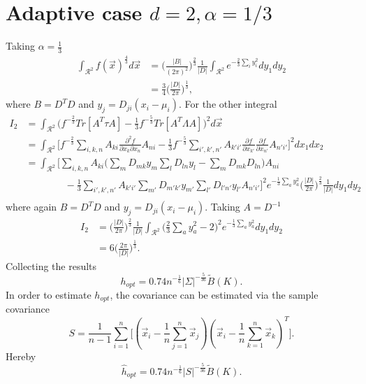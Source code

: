 \section{Adaptive case $d=2,\alpha=1/3$}
Taking $\alpha=\frac{1}{3}$
\begin{equation}
	\begin{split}
		\int_{\mathcal{R}^2}f(\vec{x})^{\frac{4}{3}}d\vec{x}&=\bigg(\frac{|B|}{(2\pi)^2}\bigg)^\frac{2}{3}\frac{1}{|D|}\int_{\mathcal{R}^2}e^{-\frac{2}{3}\sum_iy_i^2}dy_1dy_2\\
		&=\frac{3}{4}\bigg(\frac{|D|}{2\pi}\bigg)^\frac{1}{3},
	\end{split}
\end{equation}
where $B=D^TD$ and $y_j=D_{ji}(x_i-\mu_i)$. For the other integral
\begin{equation}
	\begin{split}
		I_2&=\int_{\mathcal{R}^2} \big(f^{-\frac{2}{3}}Tr[A^T\tau A]-\frac{1}{3}f^{-\frac{5}{3}}Tr[A^T\Lambda A]\big)^2d\vec{x}\\
		&=\int_{\mathcal{R}^2}\bigg[f^{-\frac{2}{3}}\sum_{i,k,n}A_{ki}\frac{\partial^2 f}{\partial x_k\partial x_n}A_{ni}-\frac{1}{3}f^{-\frac{5}{3}}\sum_{i',k',n'}A_{k'i'}\frac{\partial f}{\partial x_{k'}}\frac{\partial f}{\partial x_{n'}}A_{n'i'}\bigg]^2dx_1dx_2\\
		&=\int_{\mathcal{R}^2}\bigg[\sum_{i,k,n}A_{ki}\bigg(\sum_mD_{mk}y_m\sum_lD_{ln}y_l-\sum_{m}D_{mk}D_{ln}\bigg)A_{ni}\\
		&\qquad \qquad-\frac{1}{3}\sum_{i',k',n'}A_{k'i'}\sum_{m'}D_{m'k'}y_{m'}\sum_{l'}D_{l'n'}y_{l'}A_{n'i'}\bigg]^2e^{-\frac{1}{3}\sum_a y_a^2}\bigg(\frac{|D|}{2\pi}\bigg)^\frac{2}{3}\frac{1}{|D|}dy_1dy_2\\
	\end{split}
\end{equation}
where again $B=D^TD$ and $y_j=D_{ji}(x_i-\mu_i)$. Taking $A=D^{-1}$ 
\begin{equation}
	\begin{split}
		I_2&=\bigg(\frac{|D|}{2\pi}\bigg)^\frac{2}{3}\frac{1}{|D|}\int_{\mathcal{R}^2} \bigg(\frac{2}{3}\sum_ay_a^2-2\bigg)^2e^{-\frac{1}{3}\sum_a y_a^2}dy_1dy_2\\
		&=6\bigg(\frac{2\pi}{|D|}\bigg)^\frac{1}{3}.
	\end{split}
\end{equation}
Collecting the results
\begin{equation}
	h_{opt}= 0.74n^{-\frac{1}{6}}|\Sigma|^{-\frac{5}{36}}\tilde{B}(K).
\end{equation}
In order to estimate $h_{opt}$, the covariance can be estimated via the sample covariance
\begin{equation}
	S=\frac{1}{n-1}\sum_{i=1}^n\bigg[(\vec{x}_i-\frac{1}{n}\sum_{j=1}^n\vec{x}_j)(\vec{x}_i-\frac{1}{n}\sum_{k=1}^n\vec{x}_k)^T\bigg].
	\label{cov}
\end{equation}
Hereby
\begin{equation}
	\hat{h}_{opt}= 0.74n^{-\frac{1}{6}}|S|^{-\frac{5}{36}}\tilde{B}(K).
\end{equation}

